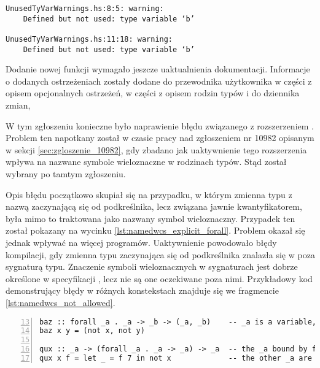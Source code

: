 \begin{lstlisting}[language={},label={lst:unused_test_stderr},
                   caption={Ostrzeżenia generowany przez kompilator dla fragmentu \ref{lst:unused_test_code} po wprowadzeniu zmian.}]
UnusedTyVarWarnings.hs:8:5: warning:
    Defined but not used: type variable ‘b’

UnusedTyVarWarnings.hs:11:18: warning:
    Defined but not used: type variable ‘b’
\end{lstlisting}

Dodanie nowej funkcji wymagało jeszcze uaktualnienia dokumentacji. Informacje o dodanych ostrzeżeniach zostały dodane do przewodnika użytkownika w części z opisem opcjonalnych ostrzeżeń, w części z opisem rodzin typów i do dziennika zmian,


\label{sec:zgloszenie_11098}

W tym zgłoszeniu konieczne było naprawienie błędu związanego z rozszerzeniem . Problem ten napotkany został w czasie pracy nad zgłoszeniem nr 10982 opisanym w sekcji \ref{sec:zgloszenie_10982}, gdy zbadano jak uaktywnienie tego rozszerzenia wpływa na nazwane symbole wieloznaczne w rodzinach typów. Stąd został wybrany po tamtym zgłoszeniu.

Opis błędu początkowo skupiał się na przypadku, w którym zmienna typu z nazwą zaczynającą się od podkreślnika, lecz związana jawnie kwantyfikatorem, była mimo to traktowana jako nazwany symbol wieloznaczny. Przypadek ten został pokazany na wycinku \ref{lst:namedwcs_explicit_forall}. Problem okazał się jednak wpływać na więcej programów. Uaktywnienie  powodowało błędy kompilacji, gdy zmienna typu zaczynająca się od podkreślnika znalazła się w poza sygnaturą typu. Znaczenie symboli wieloznacznych w sygnaturach jest dobrze określone w specyfikacji , lecz nie są one oczekiwane poza nimi. Przykładowy kod demonstrujący błędy w różnych konstekstach znajduje się we fragmencie \ref{lst:namedwcs_not_allowed}.

\begin{lstlisting}[numbers=left,firstnumber=13,label={lst:namedwcs_explicit_forall},
                   caption={Fragment testu \code{NamedWildcardExplicitForall} sprawdzającego, czy zmienne związane kwantyfikatorem nie zostają zamienione w wieloznaczniki.}]
baz :: forall _a . _a -> _b -> (_a, _b)    -- _a is a variable, _b is a wildcard
baz x y = (not x, not y)

qux :: _a -> (forall _a . _a -> _a) -> _a  -- the _a bound by forall is a tyvar
qux x f = let _ = f 7 in not x             -- the other _a are wildcards
\end{lstlisting}

